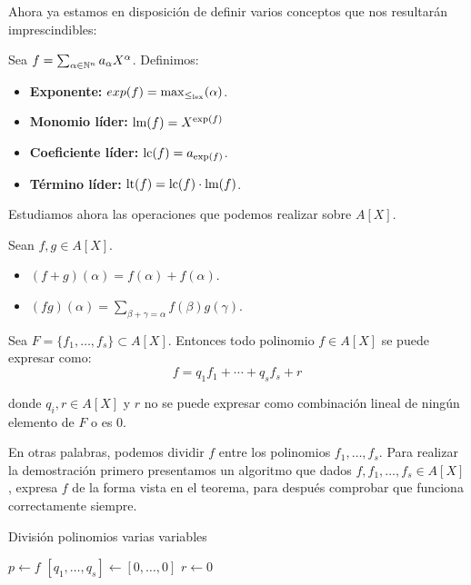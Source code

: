 Ahora ya estamos en disposición de definir varios conceptos que nos resultarán imprescindibles:

\begin{definicion}
  Sea $f= \sum_{\alpha\in \mathbb{N}^n} a_{\alpha} X^{\alpha}$. Definimos:
  \begin{itemize}
    \item \textbf{Exponente:} $exp(f) = \max_{\le_{\text{lex}}}(\alpha)$.
    \item \textbf{Monomio líder:} $\text{lm}(f) = X^{\text{exp}(f)}$
    \item \textbf{Coeficiente líder:} $\text{lc}(f) = a_{\text{exp}(f)}$.
    \item \textbf{Término líder:} $\text{lt}(f) = \text{lc}(f) \cdot \text{lm}(f)$.
  \end{itemize}
\end{definicion}

Estudiamos ahora las operaciones que podemos realizar sobre $A[X]$.

\begin{proposicion}
  Sean $f,g\in A[X]$.
  \begin{itemize}
    \item $(f+g)(\alpha) = f(\alpha) + f(\alpha)$.
    \item $(fg)(\alpha) = \sum_{\beta+\gamma=\alpha} f(\beta)g(\gamma)$.
  \end{itemize}
\end{proposicion}

\begin{teorema}
  Sea $F=\{f_1,\dots, f_s\} \subset A[X]$. Entonces todo polinomio $f\in A[X]$ se puede expresar como:
  \begin{equation*}
    f = q_1f_1 + \cdots + q_sf_s + r
  \end{equation*}

  donde $q_i, r\in A[X]$ y $r$ no se puede expresar como combinación lineal de ningún elemento de $F$ o es $0$.
\end{teorema}

En otras palabras, podemos dividir $f$ entre los polinomios $f_1, \dots, f_s$. Para realizar la demostración primero presentamos un algoritmo que dados $f,f_1,\dots, f_s \in A[X]$, expresa $f$ de la forma vista en el teorema, para después comprobar que funciona correctamente siempre.

\begin{algorithm}[hbt!]
  \caption{División polinomios varias variables}\label{alg:two}
  $p\gets f$\;
  $\left[q_1,\dots, q_s\right] \gets \left[0,\dots, 0\right]$\;
  $r\gets 0$\;

\end{algorithm}

